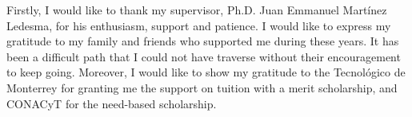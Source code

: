 Firstly, I would like to thank my supervisor, Ph.D. Juan Emmanuel Mart\'{i}nez Ledesma, for his enthusiasm, support and patience. I would like to express my gratitude to my family and friends who supported me during these years. It has been a difficult path that I could not have traverse without their encouragement to keep going. Moreover, I would like to show my gratitude to the Tecnol\'{o}gico de Monterrey for granting me the support on tuition with a merit scholarship, and CONACyT for the need-based scholarship.
